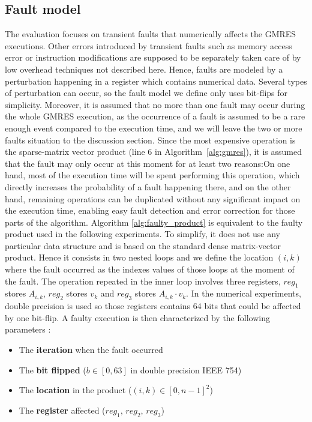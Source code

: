 \subsection{Fault model}
The evaluation focuses on transient faults that numerically affects the GMRES executions. Other errors introduced by transient faults such as memory access error or instruction modifications are supposed to be separately taken care of by low overhead techniques not described here. Hence, faults are modeled by a perturbation happening in a register which contains numerical data. Several types of perturbation can occur, so the fault model we define only uses bit-flips for simplicity. Moreover, it is assumed that no more than one fault may occur during the whole GMRES execution, as the occurrence of a fault is assumed to be a rare enough event compared to the execution time, and we will leave the two or more faults situation to the discussion section. Since the most expensive operation is the sparse-matrix vector product  (line 6 in Algorithm~\ref{alg:gmres}), it is assumed that the fault may only occur at this moment for at least two reasons:On one hand, most of the execution time will be spent performing this operation, which directly increases the probability of a fault happening there, and on the other hand, remaining operations can be duplicated without any significant impact on the execution time, enabling easy fault detection and error correction for those parts of the algorithm. Algorithm \ref{alg:faulty_product} is equivalent to the faulty product used in the following experiments. To simplify, it does not use any particular data structure and is based on the standard dense matrix-vector product. Hence it consists in two nested loops and we define the location $(i, k)$ where the fault occurred as the indexes values of those loops at the moment of the fault. The operation repeated in the inner loop involves three registers, $reg_1$ stores $A_{i, k}$, $reg_2$ stores $v_k$ and $reg_3$ stores $A_{i, k} \cdot v_k$. In the numerical experiments, double precision is used so those registers contains 64 bits that could be affected by one bit-flip.
A faulty execution is then characterized by the following parameters :
\begin{itemize}
	\item The \textbf{iteration} when the fault occurred
    \item The \textbf{bit flipped} ($b \in [0, 63]$ in double precision IEEE 754)
    \item The \textbf{location} in the product ($(i, k) \in [0, n-1]^2$)
    \item The \textbf{register} affected ($reg_1$, $reg_2$, $reg_3$)
\end{itemize}


